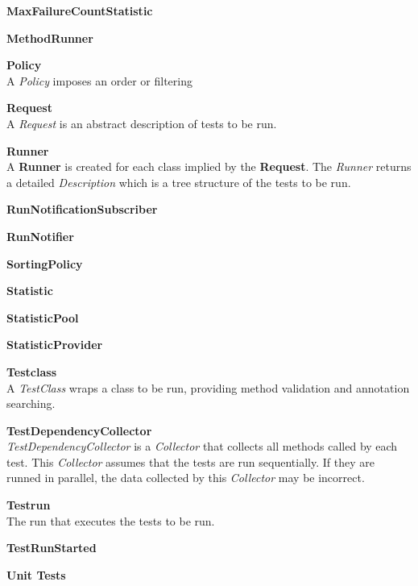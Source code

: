 \documentclass[i2]{oss}
\newcommand{\class}[1]{\emph{#1}}
\newcommand{\gloss}[1]{\textbf{#1}}
\begin{document}
\begin{description}
\item \gloss{MaxFailureCountStatistic} \\

\item \gloss{MethodRunner}

\item \gloss{Policy} \\
A \class{Policy} imposes an order or filtering 

\item \gloss{Request} \\
A \class{Request} is an abstract description of tests to be run. 

\item \gloss{Runner} \\  A \gloss{Runner} is created for each class implied by the \gloss{Request}. The \class{Runner} returns a detailed \class{Description} which is a tree structure of the tests to be run.

\item \gloss{RunNotificationSubscriber} \\


\item \gloss{RunNotifier}

\item \gloss{SortingPolicy}

\item \gloss{Statistic}

\item \gloss{StatisticPool}

\item \gloss{StatisticProvider}

\item \gloss{Testclass} \\
 A \class{TestClass} wraps a class to be run, providing method validation and annotation searching.

\item \gloss{TestDependencyCollector} \\
\class{TestDependencyCollector} is a \class{Collector} that collects all methods called by each test. This \class{Collector} assumes that the tests are run sequentially. If they are runned in parallel, the data collected by this \class{Collector} may be incorrect.


\item \gloss{Testrun} \\ 
	The run that executes the tests to be run.

\item \gloss{TestRunStarted}

\item \gloss{Unit Tests}

 
\end{description}
\end{document}
